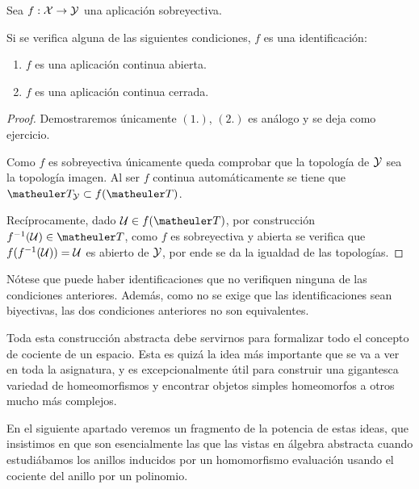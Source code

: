 \begin{prop}
	Sea $f:\mathcal{X}\to\mathcal{Y}$ una aplicación sobreyectiva.
	
	Si se verifica alguna de las siguientes condiciones, $f$ es una identificación:
	\begin{enumerate}
		\item $f$ es una aplicación continua abierta.
		\item $f$ es una aplicación continua cerrada.
	\end{enumerate}
\end{prop}
\begin{proof}
	Demostraremos únicamente $(1.)$, $(2.)$ es análogo y se deja como ejercicio.
	
	Como $f$ es sobreyectiva únicamente queda comprobar que la topología de $\mathcal{Y}$ sea la topología imagen. Al ser $f$ continua automáticamente se tiene que $\T_\Y\subset f(\T)$.
	
	Recíprocamente, dado $\U\in f(\T)$, por construcción $f^{-1}(\U)\in\T$, como $f$ es sobreyectiva y abierta se verifica que $f(f^{-1}(\mathcal{U}))=\mathcal{U}$ es abierto de $\mathcal{Y}$, por ende se da la igualdad de las topologías.
\end{proof}

Nótese que puede haber identificaciones que no verifiquen ninguna de las condiciones anteriores. Además, como no se exige que las identificaciones sean biyectivas, las dos condiciones anteriores no son equivalentes.

Toda esta construcción abstracta debe servirnos para formalizar todo el concepto de cociente de un espacio. Esta es quizá la idea más importante que se va a ver en toda la asignatura, y es excepcionalmente útil para construir una gigantesca variedad de homeomorfismos y encontrar objetos simples homeomorfos a otros mucho más complejos.

En el siguiente apartado veremos un fragmento de la potencia de estas ideas, que insistimos en que son esencialmente las que las vistas en álgebra abstracta cuando estudiábamos los anillos inducidos por un homomorfismo evaluación usando el cociente del anillo por un polinomio.
